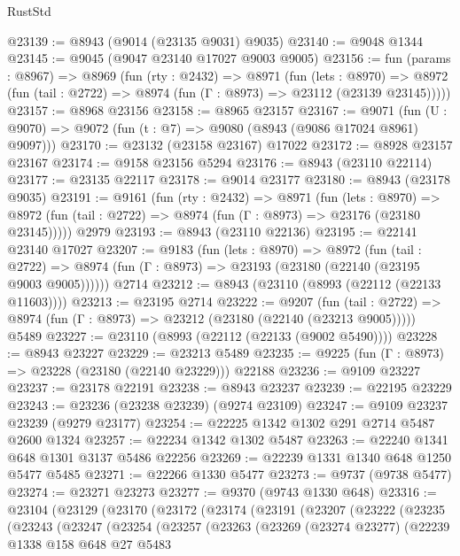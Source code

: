 \begin{lexlean}{RustStd}
\begin{coremodule}
{\begin{coremodule}
{{{{{{{{{{{{{{{{{{{{{{{{{{{{{{{{{{{{{{{@23139 := @8943 (@9014 (@23135 @9031) @9035)
@23140 := @9048 @1344
@23145 := @9045 (@9047 @23140 @17027 @9003 @9005)
@23156 := fun (params : @8967) =>
  @8969
    (fun (rty : @2432) =>
    @8971
      (fun (lets : @8970) =>
      @8972 (fun (tail : @2722) => @8974 (fun (Γ : @8973) => @23112 (@23139 @23145)))))
@23157 := @8968 @23156
@23158 := @8965 @23157
@23167 := @9071
    (fun (U : @9070) => @9072 (fun (t : @7) => @9080 (@8943 (@9086 @17024 @8961) @9097)))
@23170 := @23132 (@23158 @23167) @17022
@23172 := @8928 @23157 @23167
@23174 := @9158 @23156 @5294
@23176 := @8943 (@23110 @22114)
@23177 := @23135 @22117
@23178 := @9014 @23177
@23180 := @8943 (@23178 @9035)
@23191 := @9161
    (fun (rty : @2432) =>
    @8971
      (fun (lets : @8970) =>
      @8972 (fun (tail : @2722) => @8974 (fun (Γ : @8973) => @23176 (@23180 @23145)))))
    @2979
@23193 := @8943 (@23110 @22136)
@23195 := @22141 @23140 @17027
@23207 := @9183
    (fun (lets : @8970) =>
    @8972
      (fun (tail : @2722) =>
      @8974 (fun (Γ : @8973) => @23193 (@23180 (@22140 (@23195 @9003 @9005))))))
    @2714
@23212 := @8943 (@23110 (@8993 (@22112 (@22133 @11603))))
@23213 := @23195 @2714
@23222 := @9207
    (fun (tail : @2722) => @8974 (fun (Γ : @8973) => @23212 (@23180 (@22140 (@23213 @9005)))))
    @5489
@23227 := @23110 (@8993 (@22112 (@22133 (@9002 @5490))))
@23228 := @8943 @23227
@23229 := @23213 @5489
@23235 := @9225 (fun (Γ : @8973) => @23228 (@23180 (@22140 @23229))) @22188
@23236 := @9109 @23227
@23237 := @23178 @22191
@23238 := @8943 @23237
@23239 := @22195 @23229
@23243 := @23236 (@23238 @23239) (@9274 @23109)
@23247 := @9109 @23237 @23239 (@9279 @23177)
@23254 := @22225 @1342 @1302 @291 @2714 @5487 @2600 @1324
@23257 := @22234 @1342 @1302 @5487
@23263 := @22240 @1341 @648 @1301 @3137 @5486 @22256
@23269 := @22239 @1331 @1340 @648 @1250 @5477 @5485
@23271 := @22266 @1330 @5477
@23273 := @9737 (@9738 @5477)
@23274 := @23271 @23273
@23277 := @9370 (@9743 @1330 @648)
@23316 := @23104
    (@23129
      (@23170
        (@23172
          (@23174
            (@23191
              (@23207
                (@23222
                  (@23235
                    (@23243
                      (@23247
                        (@23254
                          (@23257
                            (@23263
                              (@23269
                                (@23274 @23277)
                                (@22239
                                  @1338
                                  @158
                                  @648
                                  @27
                                  @5483
}}}}}}}}}}}}}}}}}}}}}}}}}}}}}}}}}}}}}}}
\end{coremodule}}
\end{coremodule}
\end{lexlean}

